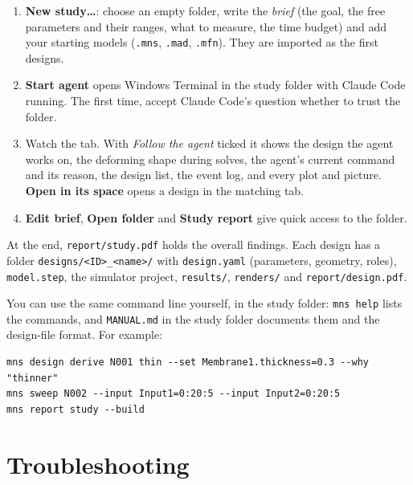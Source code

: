 \documentclass[11pt,a4paper]{article}
\newcommand{\code}[1]{\texttt{#1}}
\newcommand{\menu}[1]{\textsf{\textbf{#1}}}
\begin{document}
\begin{enumerate}
\item \menu{New study…}: choose an empty folder, write the \emph{brief} (the goal, the free parameters and their
  ranges, what to measure, the time budget) and add your starting models (\code{.mns}, \code{.mad},
  \code{.mfn}). They are imported as the first designs.
\item \menu{Start agent} opens Windows Terminal in the study folder with Claude Code running. The first time, accept
  Claude Code's question whether to trust the folder.
\item Watch the tab. With \emph{Follow the agent} ticked it shows the design the agent works on, the deforming shape
  during solves, the agent's current command and its reason, the design list, the event log, and every plot and
  picture. \menu{Open in its space} opens a design in the matching tab.
\item \menu{Edit brief}, \menu{Open folder} and \menu{Study report} give quick access to the folder.
\end{enumerate}

At the end, \code{report/study.pdf} holds the overall findings. Each design has a folder
\code{designs/<ID>\_<name>/} with \code{design.yaml} (parameters, geometry, roles), \code{model.step}, the
simulator project, \code{results/}, \code{renders/} and \code{report/design.pdf}.

You can use the same command line yourself, in the study folder: \code{mns help} lists the commands, and
\code{MANUAL.md} in the study folder documents them and the design-file format. For example:
\begin{verbatim}
mns design derive N001 thin --set Membrane1.thickness=0.3 --why "thinner"
mns sweep N002 --input Input1=0:20:5 --input Input2=0:20:5
mns report study --build
\end{verbatim}

\section{Troubleshooting}
\end{document}
